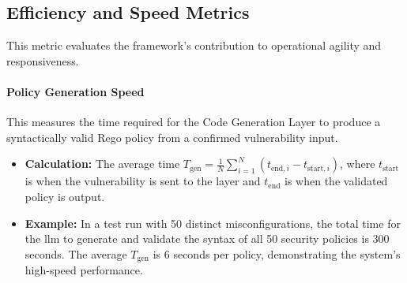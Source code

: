 \subsection*{Efficiency and Speed Metrics}
This metric evaluates the framework's contribution to operational agility and responsiveness.

\paragraph{Policy Generation Speed} This measures the time required for the Code Generation Layer to produce a syntactically valid Rego policy from a confirmed vulnerability input.
\begin{itemize}
    \item \textbf{Calculation:} The average time \( T_{\text{gen}} = \frac{1}{N} \sum_{i=1}^{N} (t_{\text{end},i} - t_{\text{start},i}) \), where \( t_{\text{start}} \) is when the vulnerability is sent to the layer and \( t_{\text{end}} \) is when the validated policy is output.
    \item \textbf{Example:} In a test run with 50 distinct misconfigurations, the total time for the \gls{llm} to generate and validate the syntax of all 50 security policies is 300 seconds. The average \( T_{\text{gen}} \) is 6 seconds per policy, demonstrating the system's high-speed performance.
\end{itemize}


